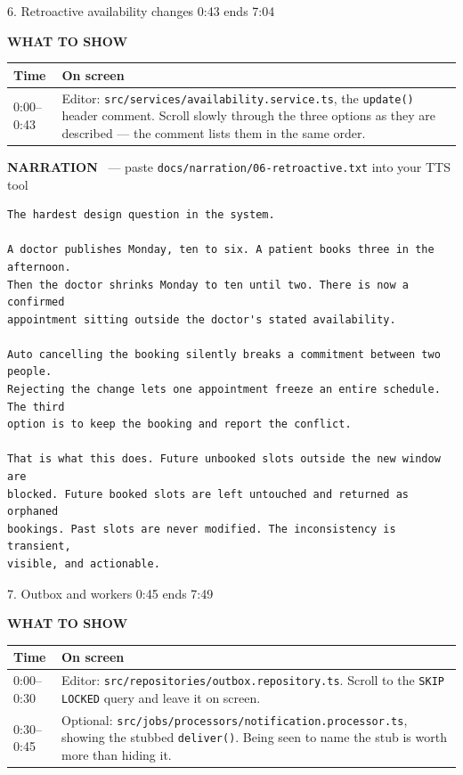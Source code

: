 \documentclass[11pt,a4paper]{article}
\newcommand{\segbar}[3]{%
  \vspace{12pt}
  \noindent\colorbox{accent}{\parbox{\dimexpr\textwidth-2\fboxsep}{%
    \color{white}\bfseries\large\strut #1 \hfill \normalsize #2 \quad ends #3}}
  \par\vspace{7pt}}
\newcommand{\showhdr}{\noindent\textcolor{showc}{\textbf{WHAT TO SHOW}}\par\vspace{2pt}}
\newcommand{\voicehdr}[1]{\vspace{4pt}\noindent\textcolor{voice}{\textbf{NARRATION}}%
  \ \textcolor{soft}{\small --- paste \texttt{docs/narration/#1.txt} into your TTS tool}\par\vspace{2pt}}
\begin{document}
\segbar{6. Retroactive availability changes}{0:43}{7:04}

\showhdr
\begin{longtable}{@{}p{1.6cm} p{13.4cm}@{}}
\toprule
\textbf{Time} & \textbf{On screen} \\
\midrule
\endhead
0:00--0:43 & Editor: \texttt{src/services/availability.service.ts}, the \texttt{update()}
             header comment. Scroll slowly through the three options as they are
             described --- the comment lists them in the same order. \\
\bottomrule
\end{longtable}

\voicehdr{06-retroactive}
\begin{lstlisting}[style=tts]
The hardest design question in the system.

A doctor publishes Monday, ten to six. A patient books three in the afternoon.
Then the doctor shrinks Monday to ten until two. There is now a confirmed
appointment sitting outside the doctor's stated availability.

Auto cancelling the booking silently breaks a commitment between two people.
Rejecting the change lets one appointment freeze an entire schedule. The third
option is to keep the booking and report the conflict.

That is what this does. Future unbooked slots outside the new window are
blocked. Future booked slots are left untouched and returned as orphaned
bookings. Past slots are never modified. The inconsistency is transient,
visible, and actionable.
\end{lstlisting}

\segbar{7. Outbox and workers}{0:45}{7:49}

\showhdr
\begin{longtable}{@{}p{1.6cm} p{13.4cm}@{}}
\toprule
\textbf{Time} & \textbf{On screen} \\
\midrule
\endhead
0:00--0:30 & Editor: \texttt{src/repositories/outbox.repository.ts}. Scroll to the
             \texttt{SKIP LOCKED} query and leave it on screen. \\
0:30--0:45 & Optional: \texttt{src/jobs/processors/notification.processor.ts}, showing
             the stubbed \texttt{deliver()}. Being seen to name the stub is worth
             more than hiding it. \\
\bottomrule
\end{longtable}
\end{document}
